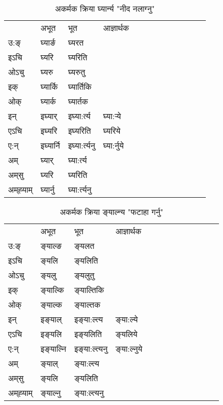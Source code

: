 \begin{table}[H]
\centering
\caption{\label{ɛr.vi} अकर्मक क्रिया  घ्यार्न्य  "नीद नलाग्नु"  }
\begin{tabular}{l|l|l|l|l|l|l|l|l|l|l|l|l}  \toprule
&अभूत & भूत & आज्ञार्थक \\ 
उ:ङ्‌ &घ्यार्ङ &घ्यरत \\ 
इऽचि &घ्यरि &घ्यरिति   \\ 
ओऽचु &घ्यरु &घ्यरुतु   \\ 
इक् &घ्यार्कि &घ्यार्तिकि   \\ 
ओक् &घ्यार्क &घ्यार्तक   \\ 
इन् & इघ्यार् & इघ्या:र्त्य &घ्या:र्‍ये  \\ 
एऽचि & इघ्यरि & इघ्यरिति &घ्यरिये    \\ 
ए:न् & इघ्यार्नि  & इघ्या:र्त्यनु &घ्या:र्नुये  \\ 
अम् & घ्यार् & घ्या:र्त्य   \\ 
अम्‌सु & घ्यरि & घ्यरिति   \\ 
अम्‌ह्‍याम् & घ्यार्नु  & घ्या:र्त्यनु \\ 
\bottomrule
\end{tabular}
\end{table}


\begin{table}[H]
\centering
\caption{\label{ɛl.vi} अकर्मक क्रिया  ङ्‌याल्न्य  "फटाहा गर्नु"  }
\begin{tabular}{l|l|l|l|l|l|l|l|l|l|l|l|l}  \toprule
&अभूत & भूत & आज्ञार्थक \\ 
उ:ङ्‌ &ङ्‌याल्ङ &ङ्‌यलत \\ 
इऽचि &ङ्‌यलि &ङ्‌यलिति   \\ 
ओऽचु &ङ्‌यलु &ङ्‌यलुतु   \\ 
इक् &ङ्‌याल्कि &ङ्‌याल्तिकि   \\ 
ओक् &ङ्‌याल्क &ङ्‌याल्तक   \\ 
इन् & इङ्‌याल् & इङ्‌या:ल्त्य &ङ्‌या:ल्ये  \\ 
एऽचि & इङ्‌यलि & इङ्‌यलिति &ङ्‌यलिये    \\ 
ए:न् & इङ्‌याल्नि  & इङ्‌या:ल्त्यनु &ङ्‌या:ल्नुये  \\ 
अम् & ङ्‌याल् & ङ्‌या:ल्त्य   \\ 
अम्‌सु & ङ्‌यलि & ङ्‌यलिति   \\ 
अम्‌ह्‍याम् & ङ्‌याल्नु  & ङ्‌या:ल्त्यनु \\ 
\bottomrule
\end{tabular}
\end{table}


